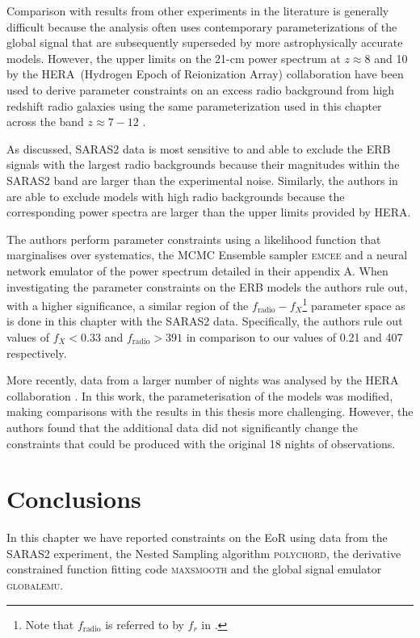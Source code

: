 Comparison with results from other experiments in the literature is generally difficult because the analysis often uses contemporary parameterizations of the global signal that are subsequently superseded by more astrophysically accurate models. However, the upper limits on the 21-cm power spectrum at $z\approx8$ and 10 by the HERA~(Hydrogen Epoch of Reionization Array) collaboration have been used to derive parameter constraints on an excess radio background from high redshift radio galaxies using the same parameterization used in this chapter across the band $z \approx 7 - 12$ \citep{HERA_2022a, HERA_2022b}.

As discussed, SARAS2 data is most sensitive to and able to exclude the ERB signals with the largest radio backgrounds because their magnitudes within the SARAS2 band are larger than the experimental noise. Similarly, the authors in \cite{HERA_2022b} are able to exclude models with high radio backgrounds because the corresponding power spectra are larger than the upper limits provided by HERA.

The authors perform parameter constraints using a likelihood function that marginalises over systematics, the MCMC Ensemble sampler \textsc{emcee} \citep{Foreman_Mackey_2013} and a neural network emulator of the power spectrum detailed in their appendix A. When investigating the parameter constraints on the ERB models the authors rule out, with a higher significance, a similar region of the $f_\mathrm{radio} - f_X$\footnote{Note that $f_\mathrm{radio}$ is referred to by $f_r$ in \cite{HERA_2022b}.} parameter space as is done in this chapter with the SARAS2 data. Specifically, the authors rule out values of $f_X < 0.33$ and $f_\mathrm{radio} > 391$ in comparison to our values of 0.21 and 407 respectively.

More recently, data from a larger number of nights was analysed by the HERA collaboration \cite{HERA_2022c}. In this work, the parameterisation of the models was modified, making comparisons with the results in this thesis more challenging. However, the authors found that the additional data did not significantly change the constraints that could be produced with the original 18 nights of observations.

\section{Conclusions}
\label{sec:saras2_conclusions}

In this chapter we have reported constraints on the EoR using data from the SARAS2 experiment, the Nested Sampling algorithm \textsc{polychord}, the derivative constrained function fitting code \textsc{maxsmooth} and the global signal emulator \textsc{globalemu}. 

